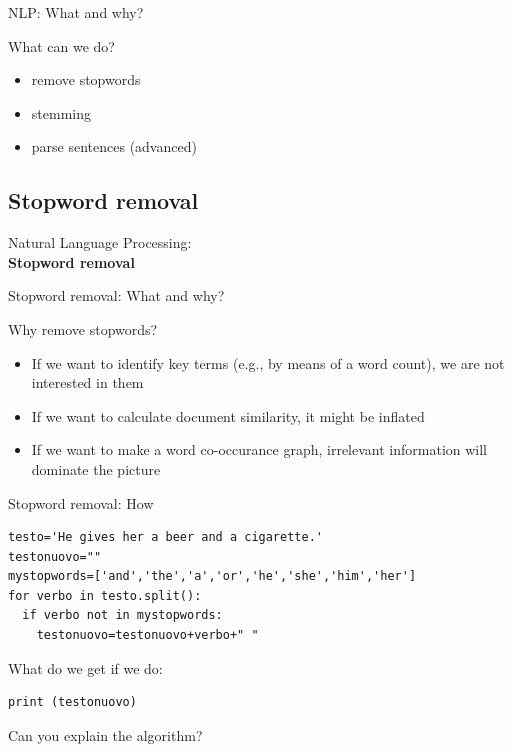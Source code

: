 \documentclass{beamer}
\begin{document}
\begin{frame}{NLP: What and why?}
\begin{block}{What can we do?}
\begin{itemize}
\item<1-> remove stopwords
\item<2-> stemming
\item<3-> parse sentences (advanced)
\end{itemize}
\end{block}
\end{frame}






\subsection{Stopword removal}
\begin{frame}
Natural Language Processing:\\
\textbf{Stopword removal} \\
\vspace{1cm}
\end{frame}


\begin{frame}{Stopword removal: What and why?}
\begin{block}{Why remove stopwords?}
\begin{itemize}
\item If we want to identify key terms (e.g., by means of a word count), we are not interested in them
\item If we want to calculate document similarity, it might be inflated
\item If we want to make a word co-occurance graph, irrelevant information will dominate the picture
\end{itemize}
\end{block}
\end{frame}


\begin{frame}[fragile]{Stopword removal: How}
\begin{lstlisting}
testo='He gives her a beer and a cigarette.'
testonuovo=""
mystopwords=['and','the','a','or','he','she','him','her']
for verbo in testo.split():
  if verbo not in mystopwords:
    testonuovo=testonuovo+verbo+" "
\end{lstlisting}
What do we get if we do:
\begin{lstlisting}
print (testonuovo)
\end{lstlisting}
Can you explain the algorithm?
\end{frame}
\end{document}
